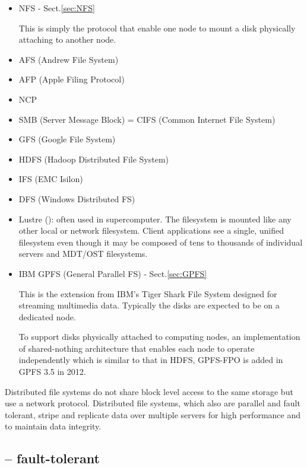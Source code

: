 \begin{itemize}
  
  \item NFS - Sect.\ref{sec:NFS}

This is simply the protocol that enable one node to mount a disk physically
attaching to another node.
  
  \item AFS (Andrew File System)
  \item AFP (Apple Filing Protocol)
  \item NCP	
  \item SMB (Server Message Block) = CIFS (Common Internet File System)
  
  \item GFS (Google File System)
  
  \item HDFS (Hadoop Distributed File System)

  
  \item IFS (EMC Isilon)
  
  \item DFS (Windows Distributed FS)
  
  \item Lustre (): often used in supercomputer. The filesystem is mounted like
  any other local or network filesystem.  Client applications see a single,
  unified filesystem even though it may be composed of tens to thousands of
  individual servers and MDT/OST filesystems. 
  
  \item IBM GPFS (General Parallel FS) - Sect.\ref{sec:GPFS}
  
This is the extension from IBM's Tiger Shark File System designed for streaming
multimedia data. Typically the disks are expected to be on a dedicated node.

To support disks physically attached to computing nodes, an implementation of
shared-nothing architecture that enables each node to operate independently
which is similar to that in HDFS, GPFS-FPO is added in GPFS 3.5 in 2012.

\end{itemize}

Distributed file systems do not share block level access to the same storage but
use a network protocol. Distributed file systems, which also are parallel and
fault tolerant, stripe and replicate data over multiple servers for high
performance and to maintain data integrity. 


\subsection{-- fault-tolerant}

